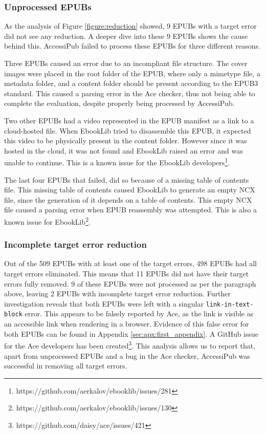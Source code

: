 \subsubsection{Unprocessed EPUBs}
As the analysis of Figure \ref{figure:reduction} showed, 9 EPUBs with a target error did not see any reduction. A deeper dive into these 9 EPUBs shows the cause behind this. AccessiPub failed to process these EPUBs for three different reasons. 

Three EPUBs caused an error due to an incompliant file structure. The cover images were placed in the root folder of the EPUB, where only a mimetype file, a metadata folder, and a content folder should be present according to the EPUB3 standard. This caused a parsing error in the Ace checker, thus not being able to complete the evaluation, despite properly being processed by AccessiPub.

Two other EPUBs had a video represented in the EPUB manifest as a link to a cloud-hosted file. When EbookLib tried to disassemble this EPUB, it expected this video to be physically present in the content folder. However since it was hosted in the cloud, it was not found and EbookLib raised an error and was unable to continue. This is a known issue for the EbookLib developers\footnote{https://github.com/aerkalov/ebooklib/issues/281}.

The last four EPUBs that failed, did so because of a missing table of contents file. This missing table of contents caused EbookLib to generate an empty NCX file, since the generation of it depends on a table of contents. This empty NCX file caused a parsing error when EPUB reassembly was attempted. This is also a known issue for EbookLib\footnote{https://github.com/aerkalov/ebooklib/issues/130}.


\subsubsection{Incomplete target error reduction}
Out of the 509 EPUBs with at least one of the target errors, 498 EPUBs had all target errors eliminated. This means that 11 EPUBs did not have their target errors fully removed. 9 of these EPUBs were not processed as per the paragraph above, leaving 2 EPUBs with incomplete target error reduction. Further investigation reveals that both EPUBs were left with a singular \texttt{link-in-text-block} error. This appears to be falsely reported by Ace, as the link is visible as an accessible link when rendering in a browser. Evidence of this false error for both EPUBs can be found in Appendix \ref{sec:apx:first_appendix}. A GitHub issue for the Ace developers has been created\footnote{https://github.com/daisy/ace/issues/421}. This analysis allows us to report that, apart from unprocessed EPUBs and a bug in the Ace checker, AccessiPub was successful in removing all target errors.


